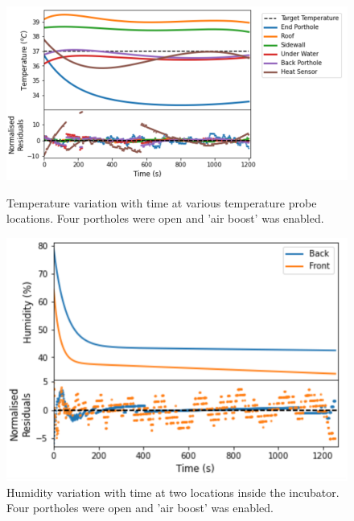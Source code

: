 \documentclass{article}
\begin{document}
\begin{figure}[H]
\centering
\begin{minipage}{.57\linewidth}
    \captionsetup{justification=centering,margin=0.5cm}
    \includegraphics[width=\textwidth]{4 holes air boost.png}
    \caption{Temperature variation with time at various temperature probe locations. Four portholes were open and 'air boost' was enabled.}
\end{minipage}
\hfill
\begin{minipage}{.42\linewidth}
    \captionsetup{justification=centering,margin=0.3cm}
    \includegraphics[width=\textwidth]{4 doors humidity air boost.png}
    \caption{Humidity variation with time at two locations inside the incubator. Four portholes were open and 'air boost' was enabled.}
    \end{minipage}
\end{figure}
\end{document}
